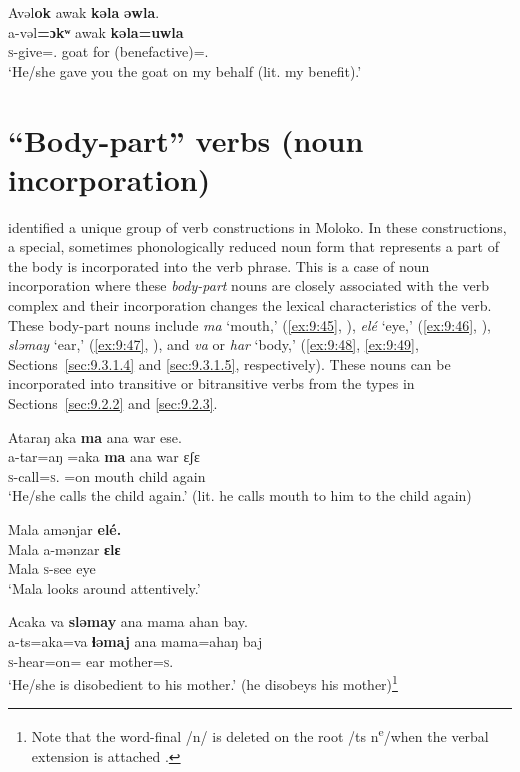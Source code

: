 \ea \label{ex:9:44}
Avəl\textbf{ok}  awak  \textbf{kəla} \textbf{əwla}.\\
\gll  a-vəl\textbf{=ɔkʷ}    awak  \textbf{kəla}\textbf{=uwla}\\
      \textsc{s}-give={\twoS}.{\IO}  goat  {for (benefactive)}={\oneS}.{\POSS} \\
\glt  ‘He/she gave you the goat on my behalf (lit. my benefit).’
\z

\section{“Body-part” verbs (noun incorporation)}\label{sec:9.3}
\hypertarget{RefHeading1212761525720847}{}
\citet{FriesenMamalis2008} identified a unique group of verb constructions in Moloko. In these constructions, a special, sometimes phonologically reduced noun form that represents a part of the body is incorporated into the verb phrase.  This is a case of noun incorporation where these \textit{body-part} nouns are closely associated with the verb complex and their incorporation changes the lexical characteristics of the verb. These body-part nouns include \textit{ma} ‘mouth,’ (\ref{ex:9:45}, ), \textit{elé} ‘eye,’ (\ref{ex:9:46}, ), \textit{sləmay} ‘ear,’ (\ref{ex:9:47}, ), and \textit{va} or \textit{har} ‘body,’ (\ref{ex:9:48}, \ref{ex:9:49}, Sections~\ref{sec:9.3.1.4} and \ref{sec:9.3.1.5}, respectively). These nouns can be incorporated into transitive or bitransitive verbs from the types in Sections~\ref{sec:9.2.2} and \ref{sec:9.2.3}.

\ea \label{ex:9:45}
Ataraŋ  aka  \textbf{ma}  ana  war  ese.\\
\gll  a-tar=aŋ     =aka   \textbf{ma}  ana  war  ɛʃɛ\\
      \textsc{s}-call=\textsc{s}.{\IO}  =on  mouth  {\DAT} child  again\\
\glt  ‘He/she calls the child again.’ (lit. he calls mouth to him to the child again)
\z

\ea \label{ex:9:46}
Mala  amənjar  \textbf{elé.}\\
\gll  Mala   a-mənzar   \textbf{ɛlɛ}\\
      Mala   \textsc{s}-see    eye\\
\glt  ‘Mala looks around attentively.’ 
\z

\ea \label{ex:9:47}
Acaka  va  \textbf{sləmay}  ana  mama  ahan  bay.\\
\gll  a-ts=aka=va  \textbf{ɬəmaj}   ana  mama=ahaŋ    baj\\
      \textsc{s}-hear=on={\PRF}  ear  {\DAT} mother=\textsc{s}.{\POSS}  {\NEG}\\
\glt  ‘He/she is disobedient to his mother.’ (he disobeys his mother)\footnote{Note that the word-final /n/ is deleted on the root /ts n\textsuperscript{e}/when the verbal extension is attached .} 
\z


